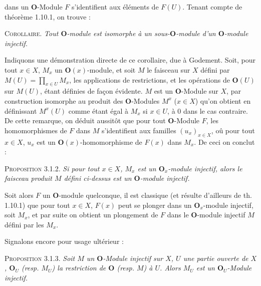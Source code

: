 
\noindent dans un $\mathbf O$-Module $F$ s'identifient aux éléments de $F(U)$.
Tenant compte de théorème 1.10.1, on trouve :

\indent\textsc{Corollaire.} \textit{Tout $\mathbf O$-module est isomorphe à un
sous-$\mathbf O$-module d'un $\mathbf O$-module injectif.}

Indiquons une démonstration directe de ce corollaire, due à Godement. Soit,
pour tout $x\in X$, $M_x$ un $\mathbf O(x)$-module, et soit $M$ le faisceau
sur $X$ défini par
$M(U)=\displaystyle\prod_{x\in U}M_x$,
les applications de restrictions, et les opérations de $\mathbf O(U)$ sur
$M(U)$, étant définies de façon évidente. $M$ est un $\mathbf O$-Module sur
$X$, par construction isomorphe au produit des $\mathbf O$-Modules $M^x$
($x\in X$) qu'on obtient en définissant $M^x(U)$ comme étant égal à $M_x$ si
$x\in U$, à 0 dans le cas contraire. De cette remarque, on déduit aussitôt
que pour tout $\mathbf O$-Module $F$, les homomorphismes de $F$ dans $M$
s'identifient aux familles $(u_x)_{x\in X}$, oû pour tout $x\in X$, $u_x$ est
un $\mathbf O(x)$-homomorphisme de $F(x)$ dans $M_x$. De ceci on conclut :

\indent\textsc{Proposition 3.1.2.} \textit{Si pour tout $x\in X$, $M_x$ est un
$\mathbf O_x$-module injectif, alors le faisceau produit $M$ défini ci-dessus
est un $\mathbf O$-module injectif.}

Soit alors $F$ un $\mathbf O$-module quelconque, il est classique (et résulte
d'ailleurs de th. 1.10.1) que pour tout $x\in X$, $F(x)$ peut se plonger dans
un $\mathbf O_x$-module injectif, soit $M_x$, et par suite on obtient un
plongement de $F$ dans le $\mathbf O$-module injectif $M$ défini par les
$M_x$.

Signalons encore pour usage ultérieur :

\indent\textsc{Proposition 3.1.3.} \textit{Soit $M$ un $\mathbf O$-Module
injectif sur $X$, $U$ une partie ouverte de $X$, $\mathbf O_U$ \textup{(}resp. $M_U$\textup{)}
la restriction de $\mathbf O$ \textup{(}resp. $M$\textup{)} à $U$. Alors $M_U$ est un
$\mathbf O_U$-Module injectif.}


